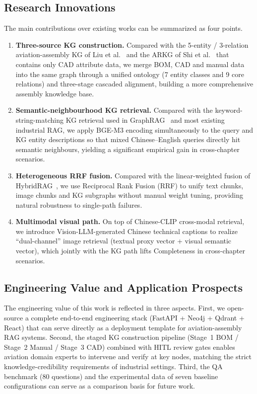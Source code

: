 \documentclass[applsci,article,submit,pdftex,moreauthors]{Definitions/mdpi}
\begin{document}
\subsection{Research Innovations}

The main contributions over existing works can be summarized as four points.

\begin{enumerate}
\item \textbf{Three-source KG construction.} Compared with the 5-entity / 3-relation aviation-assembly KG of Liu et al.~\citep{liu2023avkg} and the ARKG of Shi et al.~\citep{shi2022arkg} that contains only CAD attribute data, we merge BOM, CAD and manual data into the same graph through a unified ontology (7 entity classes and 9 core relations) and three-stage cascaded alignment, building a more comprehensive assembly knowledge base.

\item \textbf{Semantic-neighbourhood KG retrieval.} Compared with the keyword-string-matching KG retrieval used in GraphRAG~\citep{edge2024graphrag} and most existing industrial RAG, we apply BGE-M3 encoding simultaneously to the query and KG entity descriptions so that mixed Chinese--English queries directly hit semantic neighbours, yielding a significant empirical gain in cross-chapter scenarios.

\item \textbf{Heterogeneous RRF fusion.} Compared with the linear-weighted fusion of HybridRAG~\citep{shen2025hybridrag}, we use Reciprocal Rank Fusion (RRF) to unify text chunks, image chunks and KG subgraphs without manual weight tuning, providing natural robustness to single-path failures.

\item \textbf{Multimodal visual path.} On top of Chinese-CLIP cross-modal retrieval, we introduce Vision-LLM-generated Chinese technical captions to realize ``dual-channel'' image retrieval (textual proxy vector + visual semantic vector), which jointly with the KG path lifts Completeness in cross-chapter scenarios.
\end{enumerate}

\subsection{Engineering Value and Application Prospects}

The engineering value of this work is reflected in three aspects. First, we open-source a complete end-to-end engineering stack (FastAPI + Neo4j + Qdrant + React) that can serve directly as a deployment template for aviation-assembly RAG systems. Second, the staged KG construction pipeline (Stage~1 BOM / Stage~2 Manual / Stage~3 CAD) combined with HITL review gates enables aviation domain experts to intervene and verify at key nodes, matching the strict knowledge-credibility requirements of industrial settings. Third, the QA benchmark (80 questions) and the experimental data of seven baseline configurations can serve as a comparison basis for future work.
\end{document}
